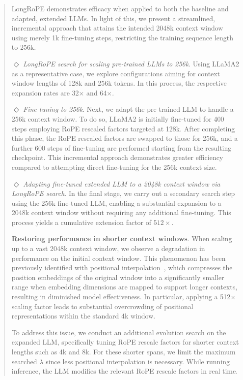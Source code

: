 \begin{abstract}
LongRoPE demonstrates efficacy when applied to both the baseline and adapted, extended LLMs. In light of this, we present a streamlined, incremental approach that attains the intended 2048k context window using merely 1k fine-tuning steps, restricting the training sequence length to 256k.

$\Diamond$ \textit{LongRoPE search for scaling pre-trained LLMs to 256k}. Using LLaMA2 as a representative case, we explore configurations aiming for context window lengths of 128k and 256k tokens. In this process, the respective expansion rates are 32$\times$ and 64$\times$.

$\Diamond$ \textit{Fine-tuning to 256k}. Next, we adapt the pre-trained LLM to handle a 256k context window. To do so, LLaMA2 is initially fine-tuned for 400 steps employing RoPE rescaled factors targeted at 128k. After completing this phase, the RoPE rescaled factors are swapped to those for 256k, and a further 600 steps of fine-tuning are performed starting from the resulting checkpoint. This incremental approach demonstrates greater efficiency compared to attempting direct fine-tuning for the 256k context size.

$\Diamond$ \textit{Adapting fine-tuned extended LLM to a 2048k context window via LongRoPE search}. In the final stage, we carry out a secondary search step using the 256k fine-tuned LLM, enabling a substantial expansion to a 2048k context window without requiring any additional fine-tuning. This process yields a cumulative extension factor of $512\times$.

\textbf{Restoring performance in shorter context windows}.  When scaling up to a vast 2048k context window, we observe a degradation in performance on the initial context window. This phenomenon has been previously identified with positional interpolation~\cite{pi}, which compresses the position embeddings of the original window into a significantly smaller range when embedding dimensions are mapped to support longer contexts, resulting in diminished model effectiveness. In particular, applying a 512$\times$ scaling factor leads to substantial overcrowding of positional representations within the standard 4k window.

To address this issue, we conduct an additional evolution search on the expanded LLM, specifically tuning RoPE rescale factors for shorter context lengths such as 4k and 8k. For these shorter spans, we limit the maximum searched $\lambda$ since less positional interpolation is necessary. While running inference, the LLM modifies the relevant RoPE rescale factors in real time.


\end{abstract}
